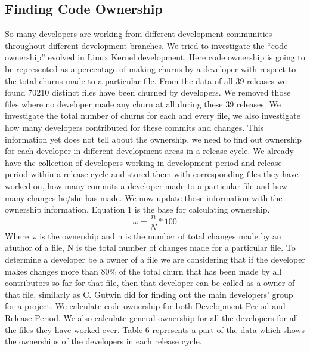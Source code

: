 \documentclass{acm_proc_article-sp}
\begin{document}
\subsection{Finding Code Ownership}
So many developers are working from different development communities throughout different development branches. We tried to investigate the ``code ownership'' \cite{mockus_case_study} evolved in Linux Kernel development. Here code ownership is going to be represented as a percentage of making churns by a developer with respect to the total churns made to a particular file. From the data of all 39 releases we found 70210 distinct files have been churned by developers. We removed those files where no developer made any churn at all during these 39 releases. We investigate the total number of churns for each and every file, we also investigate how many developers contributed for these commits and changes. This information yet does not tell about the ownership, we need to find out ownership for each developer in different development areas in a release cycle. We already have the collection of developers working in development period and release period within a release cycle and stored them with corresponding files they have worked on, how many commits a developer made to a particular file and how many changes he/she has made. We now update those information with the ownership information. Equation 1 is the base for calculating ownership.
\begin{equation}\omega=\frac{n}{N}*100\end{equation}
Where $\omega$ is the ownership and n is the number of total changes made by an atuthor of a file, N is the total number of changes made for a particular file.
To determine a developer be a owner of a file we are considering that if the developer makes changes more than 80\% of the total churn that has been made by all contributors so far for that file, then that developer can be called as a owner of that file, similarly as C. Gutwin did \cite{gutwin_awareness} for finding out the main developers' group for a project. We calculate code ownership for both Development Period and Release Period. We also calculate general ownership for all the developers for all the files they have worked ever. Table 6 represents a part of the data which shows the ownerships of the developers in each release cycle.
\end{document}
